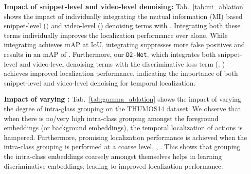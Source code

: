 \documentclass[10pt,twocolumn,letterpaper]{article}
\def\proposed{\texttt{D2-Net}{}}
\begin{document}
\noindent\textbf{Impact of snippet-level and video-level denoising:} Tab.~\ref{tab:mi_ablation} shows the impact of 
individually integrating the mutual information (MI) based snippet-level () and video-level () denoising terms with . Integrating both these terms individually improves the localization performance over  alone. While integrating  achieves  mAP at IoU, integrating  suppresses more false positives and results in an mAP of . Furthermore, our \proposed{}, which integrates both snippet-level and video-level denoising terms with the discriminative loss term (\ie, ) achieves improved localization performance, indicating the importance of both snippet-level and video-level denoising for temporal localization.








\begin{table}[t]
\centering
\caption{\label{tab:gamma_ablation}\textbf{Impact of varying } on the THUMOS14 dataset. Sub-optimal localization performances are observed when there is no/very high intra-class grouping, \ie,  is 0 or 1. Promising localization performance is achieved when the intra-class embeddings are coarsely grouped, \ie, .
}
\setlength{\tabcolsep}{12pt}
\vspace{-0.2cm}

\end{table}




\noindent\textbf{Impact of varying :} Tab.~\ref{tab:gamma_ablation} shows the impact of varying the degree of intra-glass grouping on the THUMOS14 dataset. We observe that when there is no/very high intra-class grouping amongst the foreground embeddings (or background embeddings), the temporal localization of actions is hampered. Furthermore, promising localization performance is achieved when the intra-class grouping is performed at a coarse level, \ie, . This shows that grouping the intra-class embeddings coarsely amongst themselves helps in learning discriminative embeddings, leading to improved localization performance. 
\end{document}

